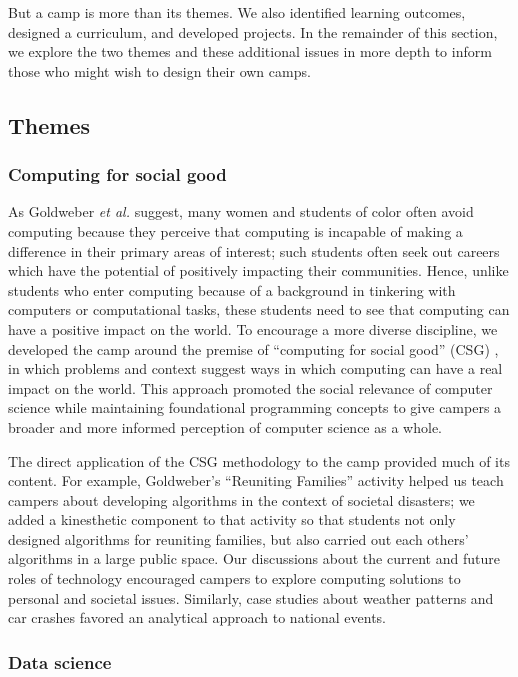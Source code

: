 But a camp is more than its themes.  We also identified learning
outcomes, designed a curriculum, and developed projects.  In the remainder
of this section, we explore the two themes and these additional
issues in more depth to inform those who might wish to design their
own camps.

\subsection{Themes}

\subsubsection{Computing for social good}

As Goldweber \textit{et al.} \cite{Goldweber2013} suggest, many women
and students of color often avoid computing because they perceive
that computing is incapable of making a difference in their primary
areas of interest; such students often seek out
careers which have the potential of positively impacting their
communities.  Hence, unlike students who enter computing because
of a background in tinkering with computers or computational tasks,
these students need to see that computing can have a positive impact
on the world.  To encourage a more diverse discipline, we developed
the camp around the premise of ``computing for social good''
(CSG) \cite{Goldweber2015}, in which problems and context suggest ways
in which computing can have a real impact on the world.  This
approach promoted the social relevance of computer science while
maintaining foundational programming concepts to give campers a
broader and more informed perception of computer science as a whole.

The direct application of the CSG methodology to the camp provided
much of its content. For example, Goldweber's ``Reuniting Families''
activity \cite{Goldweber2012} helped us teach campers about developing algorithms in the
context of societal disasters; we added a kinesthetic component to
that activity so that students not only designed algorithms for
reuniting families, but also carried out each others' algorithms
in a large public space.  Our discussions about the current and
future roles of technology encouraged campers to explore computing
solutions to personal and societal issues.  Similarly, case studies
about weather patterns and car crashes favored an analytical approach
to national events.

\subsubsection{Data science}

